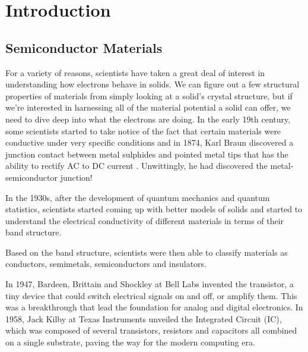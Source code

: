 
\chapter{Introduction} %

\label{Chapter1} %


\section{Semiconductor Materials}


For a variety of reasons, scientists have taken a great deal of interest in understanding how electrons behave in solids. We can figure out a few structural properties of materials from simply looking at a solid's crystal structure, but if we're interested in harnessing all of the material potential a solid can offer, we need to dive deep into what the electrons are doing. In the early 19th century, some scientists started to take notice of the fact that certain materials were conductive under very specific conditions and in 1874, Karl Braun discovered a junction contact between metal sulphides and pointed metal tips that has the  ability to rectify AC to DC current \cite{lukasiak2010history}. Unwittingly, he had discovered the metal-semiconductor junction!

In the 1930s, after the development of quantum mechanics and quantum statistics, scientists started coming up with better models of solids and started to understand the electrical conductivity of different materials in terms of their band structure.


Based on the band structure, scientists were then able to classify materials as conductors, semimetals, semiconductors and insulators.

In 1947, Bardeen, Brittain and Shockley at Bell Labs invented the transistor, a tiny device that could switch electrical signals on and off, or amplify them. This was a breakthrough that lead the foundation for analog and digital electronics. In 1958, Jack Kilby at Texas Instruments unveiled the Integrated Circuit (IC), which was composed of several transistors, resistors and capacitors all combined on a single substrate, paving the way for the modern computing era.

